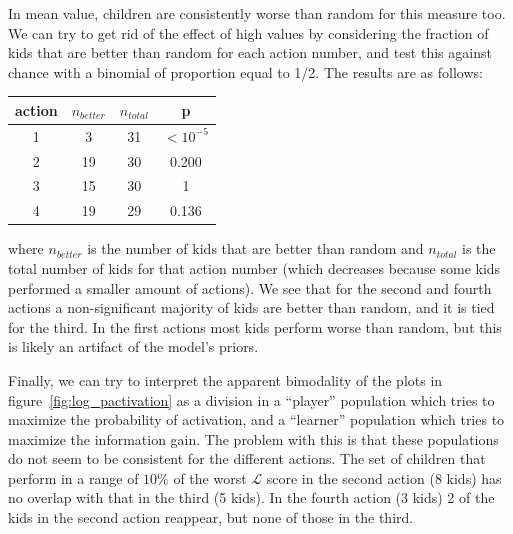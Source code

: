 \documentclass[11pt, a4paper]{article}
\begin{document}
In mean value, children are consistently worse than random for this measure too. We can try to get rid of the effect of high values by considering the fraction of kids that are better than random for each action number, and test this against chance with a binomial of proportion equal to 1/2. The results are as follows:
\begin{center}
\begin{tabular}{|c||c|c|c|}
\hline
action & $n_{better}$ & $n_{total}$ & p\\
\hline\hline
1 & 3 & 31 & $<10^{-5}$ \\ 
2 & 19 & 30 & 0.200 \\ 
3 & 15 & 30 & 1 \\ 
4 & 19 & 29 & 0.136 \\ 
\hline
\end{tabular}
\end{center}
where $n_{better}$ is the number of kids that are better than random and $n_{total}$ is the total number of kids for that action number (which decreases because some kids performed a smaller amount of actions). We see that for the second and fourth actions a non-significant majority of kids are better than random, and it is tied for the third. In the first actions most kids perform worse than random, but this is likely an artifact of the model's priors. 

Finally, we can try to interpret the apparent bimodality of the plots in figure~\ref{fig:log_pactivation} as a division in a ``player'' population which tries to maximize the probability of activation, and a ``learner'' population which tries to maximize the information gain. The problem with this is that these populations do not seem to be consistent for the different actions. The set of children that perform in a range of $10\%$ of the worst $\mathcal L$ score in the second action (8 kids) has no overlap with that in the third (5 kids). In the fourth action (3 kids) 2 of the kids in the second action reappear, but none of those in the third. 
\end{document}
